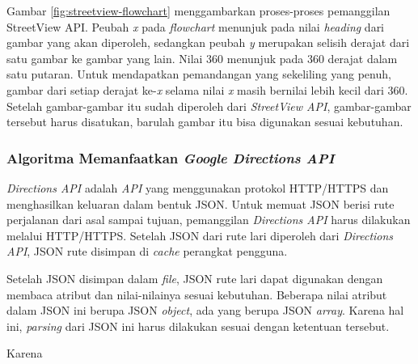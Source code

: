 Gambar \ref{fig:streetview-flowchart} menggambarkan proses-proses pemanggilan StreetView API. Peubah \textit{x} pada \textit{flowchart} menunjuk pada nilai \textit{heading} dari gambar yang akan diperoleh, sedangkan peubah \textit{y} merupakan selisih derajat dari satu gambar ke gambar yang lain. Nilai 360 menunjuk pada 360 derajat dalam satu putaran. Untuk mendapatkan pemandangan yang sekeliling yang penuh, gambar dari setiap derajat ke-\textit{x} selama nilai \textit{x} masih bernilai lebih kecil dari 360. Setelah gambar-gambar  itu sudah diperoleh dari \textit{StreetView API}, gambar-gambar tersebut harus disatukan, barulah gambar itu bisa digunakan sesuai kebutuhan.


\subsubsection{Algoritma Memanfaatkan \textit{Google Directions API}}
\textit{Directions API} adalah \textit{API} yang menggunakan protokol HTTP/HTTPS dan menghasilkan keluaran dalam bentuk JSON. Untuk memuat JSON berisi rute perjalanan dari asal sampai tujuan, pemanggilan \textit{Directions API} harus dilakukan melalui HTTP/HTTPS. Setelah  JSON dari rute lari diperoleh dari \textit{Directions API}, JSON rute disimpan di \textit{cache} perangkat pengguna.

Setelah JSON disimpan dalam \textit{file}, JSON rute lari dapat digunakan dengan membaca atribut dan nilai-nilainya sesuai kebutuhan. Beberapa nilai atribut dalam JSON ini  berupa JSON \textit{object}, ada yang berupa JSON \textit{array}. Karena hal ini,  \textit{parsing} dari JSON ini harus dilakukan sesuai dengan ketentuan tersebut. 

Karena 


%
%
%

